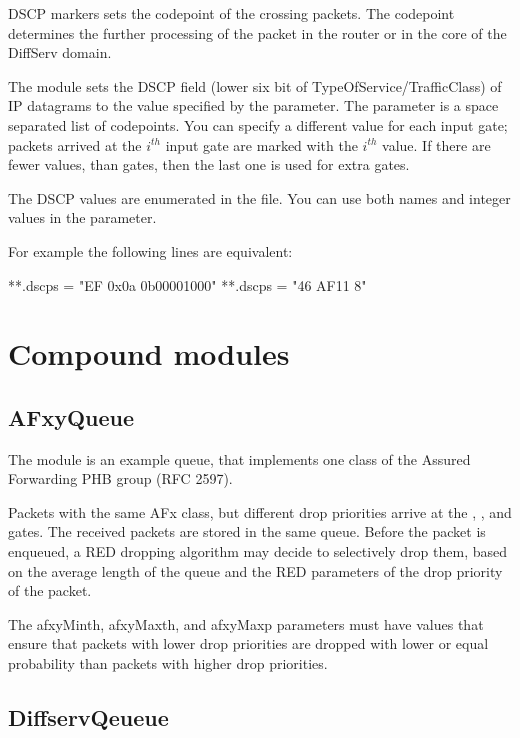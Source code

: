 DSCP markers sets the codepoint of the crossing packets.
The codepoint determines the further processing of the packet
in the router or in the core of the DiffServ domain.

The  module sets the DSCP field
(lower six bit of TypeOfService/TrafficClass) of IP datagrams
to the value specified by the  parameter.
The  parameter is a space separated list
of codepoints. You can specify a different value
for each input gate; packets arrived at the $i^{th}$
input gate are marked with the $i^{th}$ value.
If there are fewer values, than gates, then the last
one is used for extra gates.

The DSCP values are enumerated in the  file.
You can use both names and integer values in the 
parameter.

For example the following lines are equivalent:
\begin{inifile}
**.dscps = "EF 0x0a 0b00001000"
**.dscps = "46 AF11 8"
\end{inifile}

\section{Compound modules}

\subsection{AFxyQueue}

The  module is an example queue, that implements
one class of the Assured Forwarding PHB group (RFC 2597).

Packets with the same AFx class, but different drop priorities
arrive at the , , and  gates.
The received packets are stored in the same queue. Before the packet
is enqueued, a RED dropping algorithm may decide to selectively
drop them, based on the average length of the queue and the RED parameters
of the drop priority of the packet.

The afxyMinth, afxyMaxth, and afxyMaxp parameters must have values that
ensure that packets with lower drop priorities are dropped with lower
or equal probability than packets with higher drop priorities.

\subsection{DiffservQeueue}

